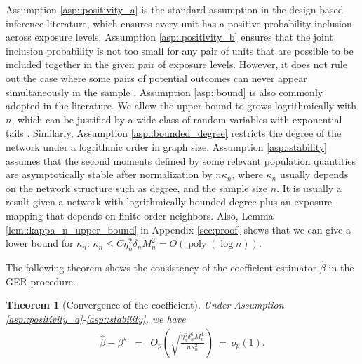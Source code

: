\documentclass{article}
\theoremstyle{plain}
\newtheorem{theorem}{Theorem}[section]
\theoremstyle{definition}
\theoremstyle{remark}
\newcommand{\bI}{\boldsymbol{I}}
\begin{document}
Assumption \ref{asp::positivity_a} is the standard assumption in the design-based inference literature, which ensures every unit has a positive probability inclusion across exposure levels. Assumption \ref{asp::positivity_b} ensures that the joint inclusion probability is not too small for any pair of units that are possible to be included together in the given pair of exposure levels. However, it does not rule out the case where some pairs of potential outcomes can never appear simultaneously in the sample \citep{aronow2017estimating}.
Assumption \ref{asp::bound} is also commonly adopted in the literature. We allow the upper bound to grows logrithmically with $n$, which can be justified by a wide class of random variables with exponential tails \citep{shi2025berry}. Similarly, Assumption \ref{asp::bounded_degree} restricts the degree of the network under a logrithmic order in graph size. Assumption \ref{asp::stability} assumes that the second moments defined by some relevant population quantities are asymptotically stable after normalization by $n\kappa_n$, where $\kappa_n$ usually depends on the network structure such as degree, and the sample size $n$. It is usually a result given a network with logrithmically bounded degree plus an exposure mapping that depends on finite-order neighbors. 
Also, Lemma \ref{lem::kappa_n_upper_bound} in Appendix \ref{sec:proof} shows that we can give a lower bound for $\kappa_n$: $ \kappa_n \leq {C\eta_n^2 \delta_n M_n^2} = O(\operatorname{poly}(\log n))$.

The following theorem shows the consistency of the coefficient estimator $\hat\beta$ in the GER procedure.
\begin{theorem}[Convergence of the coefficient]\label{thm:convergence_beta}
    Under Assumption \ref{asp::positivity_a}-\ref{asp::stability}, we have
    \begin{eqnarray*}
        \hat\beta - \beta^\star &=& O_p\left(\sqrt{\frac{\eta_n^6 \delta_n^6 M_n^4}{n \kappa_n^2}}\right) ~=~ o_p(1).
    \end{eqnarray*}
\end{theorem}
\end{document}
